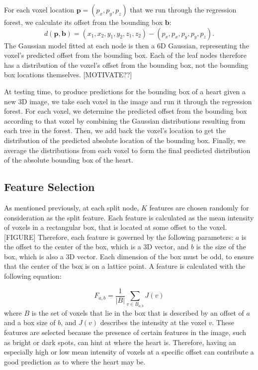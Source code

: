 For each voxel location $\mathbf{p}=(p_x, p_y, p_z)$ that we run through the regression forest, we calculate its offset from the bounding box $\mathbf{b}$:
\begin{equation}
  d(\mathbf{p}, \mathbf{b}) = (x_1, x_2, y_1, y_2, z_1, z_2) - (p_x, p_x, p_y, p_y, p_z).
\end{equation}
The Gaussian model fitted at each node is then a 6D Gaussian, representing the voxel's predicted offset from the bounding box. Each of the leaf nodes therefore has a distribution of the voxel's offset from the bounding box, not the bounding box locations themselves. [MOTIVATE??]

At testing time, to produce predictions for the bounding box of a heart given a new 3D image, we take each voxel in the image and run it through the regression forest. For each voxel, we determine the predicted offset from the bounding box according to that voxel by combining the Gaussian distributions resulting from each tree in the forest. Then, we add back the voxel's location to get the distribution of the predicted absolute location of the bounding box. Finally, we average the distributions from each voxel to form the final predicted distribution of the absolute bounding box of the heart.

\subsection{Feature Selection}
As mentioned previously, at each split node, $K$ features are chosen randomly for consideration as the split feature. Each feature is calculated as the mean intensity of voxels in a rectangular box, that is located at some offset to the voxel. [FIGURE] Therefore, each feature is governed by the following parameters: $a$ is the offset to the center of the box, which is a 3D vector, and $b$ is the size of the box, which is also a 3D vector. Each dimension of the box must be odd, to ensure that the center of the box is on a lattice point. A feature is calculated with the following equation:

\begin{equation}
  F_{a, b} = \frac{1}{|B|} \sum_{v \in B_{a, b}} J(v)
\end{equation}
where $B$ is the set of voxels that lie in the box that is described by an offset of $a$ and a box size of $b$, and $J(v)$ describes the intensity at the voxel $v$. These features are selected because the presence of certain features in the image, such as bright or dark spots, can hint at where the heart is. Therefore, having an especially high or low mean intensity of voxels at a specific offset can contribute a good prediction as to where the heart may be.

